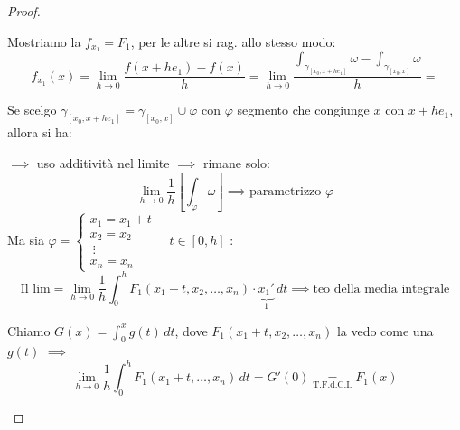 \begin{proof}
\begin{itemize}
    Mostriamo la $f_{x_1} = F_1$, per le altre si rag. allo stesso modo:
    \[
    f_{x_1}(x) = \lim_{h \to 0} \frac{f(x + h e_1) - f(x)}{h} = \lim_{h \to 0} \frac{\displaystyle\int_{\gamma_{[x_0, x + h e_1]}} \omega - \int_{\gamma_{[x_0, x]}} \omega}{h} =
    \]
    \begin{center}
    \end{center}
    Se scelgo $\gamma_{[x_0, x + h e_1]} = \gamma_{[x_0, x]} \cup \varphi$ con $\varphi$ segmento che congiunge $x$ con $x + h e_1$, allora si ha:

    $\implies$ uso additività nel limite $\implies$ rimane solo:
    \[
    \lim_{h \to 0} \frac{1}{h} \left[ \int_\varphi \omega \right] \implies \text{parametrizzo } \varphi
    \]
    Ma sia $\varphi = \begin{cases} x_1 = x_1 + t \\ x_2 = x_2 \\ \ \vdots \\ x_n = x_n \end{cases} \quad t \in [0, h]$ :
    \[
    \text{Il lim} = \lim_{h \to 0} \frac{1}{h} \int_0^h F_1(x_1 + t, x_2, \dots, x_n) \cdot \underbrace{x_1'}_{1} \, dt \implies \text{teo della media integrale}
    \]

    Chiamo $G(x) = \displaystyle\int_0^x g(t) \, dt$, dove $F_1(x_1 + t, x_2, \dots, x_n)$ la vedo come una $g(t)$ $\implies$
    \[
    \lim_{h \to 0} \frac{1}{h} \int_0^h F_1(x_1 + t, \dots, x_n) \, dt = G'(0) \underset{\text{T.F.d.C.I.}}{=} F_1(x)
    \]
\end{itemize}
\end{proof}

